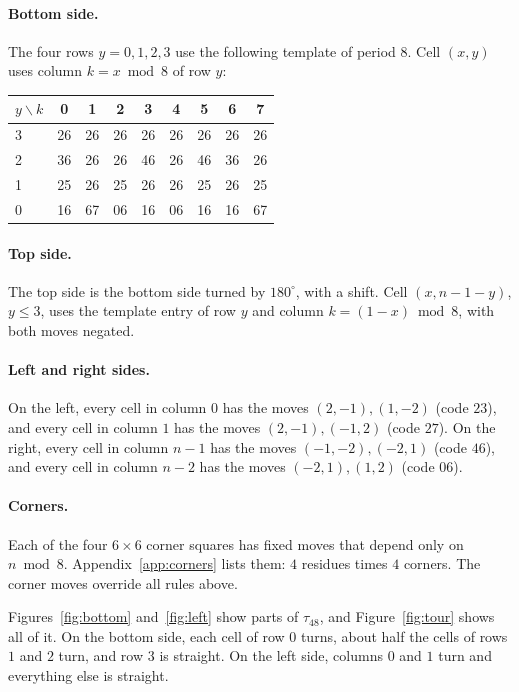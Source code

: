 \documentclass[11pt]{article}
\theoremstyle{definition}
\theoremstyle{remark}
\begin{document}
\paragraph{Bottom side.}
The four rows $y=0,1,2,3$ use the following template of period $8$.
Cell $(x,y)$ uses column $k=x\bmod 8$ of row $y$:
\begin{center}\ttfamily
\begin{tabular}{l|cccccccc}
\normalfont $y\backslash k$ & 0&1&2&3&4&5&6&7\\\midrule
3 & 26&26&26&26&26&26&26&26\\
2 & 36&26&26&46&26&46&36&26\\
1 & 25&26&25&26&26&25&26&25\\
0 & 16&67&06&16&06&16&16&67
\end{tabular}
\end{center}

\paragraph{Top side.}
The top side is the bottom side turned by $180^\circ$, with a shift.
Cell $(x,n-1-y)$, $y\le3$, uses the template entry of row $y$ and column $k=(1-x)\bmod 8$, with both moves negated.

\paragraph{Left and right sides.}
On the left, every cell in column $0$ has the moves $(2,-1),(1,-2)$ (code $23$), and every cell in column $1$ has the moves $(2,-1),(-1,2)$ (code $27$).
On the right, every cell in column $n-1$ has the moves $(-1,-2),(-2,1)$ (code $46$), and every cell in column $n-2$ has the moves $(-2,1),(1,2)$ (code $06$).

\paragraph{Corners.}
Each of the four $6\times6$ corner squares has fixed moves that depend only on $n\bmod 8$.
Appendix~\ref{app:corners} lists them: $4$ residues times $4$ corners.
The corner moves override all rules above.

\medskip
Figures~\ref{fig:bottom} and~\ref{fig:left} show parts of $\tau_{48}$, and Figure~\ref{fig:tour} shows all of it.
On the bottom side, each cell of row $0$ turns, about half the cells of rows $1$ and $2$ turn, and row $3$ is straight.
On the left side, columns $0$ and $1$ turn and everything else is straight.
\end{document}
